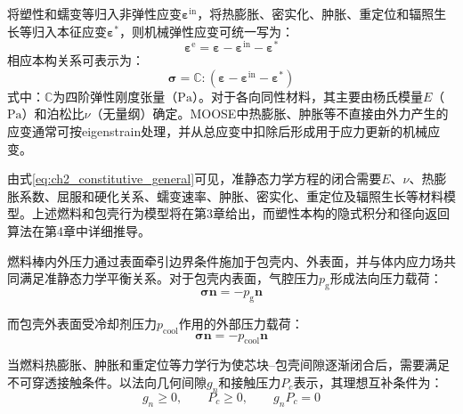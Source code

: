 将塑性和蠕变等归入非弹性应变$\boldsymbol{\varepsilon}^{\mathrm{in}}$，将热膨胀、密实化、肿胀、重定位和辐照生长等归入本征应变$\boldsymbol{\varepsilon}^{*}$，则机械弹性应变可统一写为：
\begin{equation}
	\boldsymbol{\varepsilon}^{\mathrm{e}}
	=\boldsymbol{\varepsilon}
	-\boldsymbol{\varepsilon}^{\mathrm{in}}
	-\boldsymbol{\varepsilon}^{*}
	\label{eq:ch2_elastic_strain}
\end{equation}
相应本构关系可表示为：
\begin{equation}
	\boldsymbol{\sigma}
	=\mathbb C:
	\left(
	\boldsymbol{\varepsilon}
	-\boldsymbol{\varepsilon}^{\mathrm{in}}
	-\boldsymbol{\varepsilon}^{*}
	\right)
	\label{eq:ch2_constitutive_general}
\end{equation}
\noindent 式中：$\mathbb C$为四阶弹性刚度张量（$\mathrm{Pa}$）。对于各向同性材料，其主要由杨氏模量$E$（$\mathrm{Pa}$）和泊松比$\nu$（无量纲）确定。MOOSE中热膨胀、肿胀等不直接由外力产生的应变通常可按eigenstrain处理，并从总应变中扣除后形成用于应力更新的机械应变。

由式\eqref{eq:ch2_constitutive_general}可见，准静态力学方程的闭合需要$E$、$\nu$、热膨胀系数、屈服和硬化关系、蠕变速率、肿胀、密实化、重定位及辐照生长等材料模型。上述燃料和包壳行为模型将在第3章给出，而塑性本构的隐式积分和径向返回算法在第4章中详细推导。


燃料棒内外压力通过表面牵引边界条件施加于包壳内、外表面，并与体内应力场共同满足准静态力学平衡关系。对于包壳内表面，气腔压力$p_{\mathrm g}$形成法向压力载荷：
\begin{equation}
	\boldsymbol{\sigma}\mathbf n
	=-p_{\mathrm g}\mathbf n
	\label{eq:ch2_internal_pressure_bc}
\end{equation}

而包壳外表面受冷却剂压力$p_{\mathrm{cool}}$作用的外部压力载荷：
\begin{equation}
	\boldsymbol{\sigma}\mathbf n
	=-p_{\mathrm{cool}}\mathbf n
	\label{eq:ch2_external_pressure_bc}
\end{equation}

当燃料热膨胀、肿胀和重定位等力学行为使芯块--包壳间隙逐渐闭合后，需要满足不可穿透接触条件。以法向几何间隙$g_n$和接触压力$P_c$表示，其理想互补条件为：
\begin{equation}
	g_n\ge 0,\qquad
	P_c\ge 0,\qquad
	g_nP_c=0
	\label{eq:ch2_contact_complementarity}
\end{equation}

